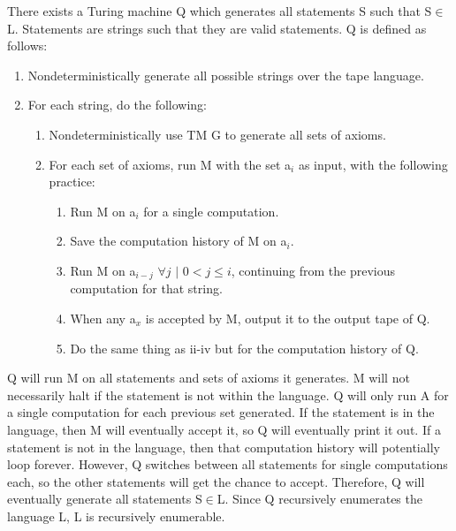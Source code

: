 \documentclass{article}
\begin{document}
There exists a Turing machine Q which generates all statements S such that S$\in$L.  Statements are strings such that they are valid statements.  Q is defined as follows:
\begin{enumerate}
\item Nondeterministically generate all possible strings over the tape language.
\item For each string, do the following:

\begin{enumerate}[label=\alph*]
\item Nondeterministically use TM G to generate all sets of axioms.
\item For each set of axioms, run M with the set a$_i$ as input, with the following practice:

\begin{enumerate}[label=\roman*.]
\item Run M on a$_i$ for a single computation.
\item Save the computation history of M on a$_i$.
\item Run M on a$_{i-j}$ $\forall j$ $|$ $0 < j \leq i$, continuing from the previous computation for that string.
\item When any a$_x$ is accepted by M, output it to the output tape of Q.
\item Do the same thing as ii-iv but for the computation history of Q.
\end{enumerate}
\end{enumerate}
\end{enumerate}

Q will run M on all statements and sets of axioms it generates.  M will not necessarily halt if the statement is not within the language.  Q will only run A for a single computation for each previous set generated.  If the statement is in the language, then M will eventually accept it, so Q will eventually print it out.  If a statement is not in the language, then that computation history will potentially loop forever.  However, Q switches between all statements for single computations each, so the other statements will get the chance to accept.  Therefore, Q will eventually generate all statements S$\in$L.  Since Q recursively enumerates the language L, L is recursively enumerable.
\end{document}
